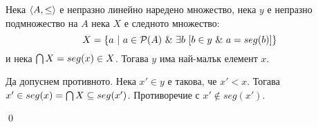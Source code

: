 \begin{tcolorbox}[mybox={Лема 3}, colback=purple!20, colframe=purple!40]

\quad
Нека $\langle A, \leq \rangle$ е непразно линейно наредено множество, нека $y$ е непразно подмножество на $A$
нека $X$ е следното множество:
\[
X = \{ a\ |\ a \in \mathcal{P}(A) \ \&\  \exists b\ [ b \in y \ \&\   a = seg(b)] \}
\]
\quad
и нека $\bigcap X = seg(x) \in X$. Тогава $y$ има най-малък елемент $x$.
\end{tcolorbox}

\begin{tcolorbox}[mybox={Доказателство:}]
\quad
Да допуснем противното.
Нека $x' \in y$ е такова, че $x' < x$.
Тогава $x' \in seg(x) = \bigcap X \subseteq seg(x')$.
Противоречие с $x' \notin seg(x')$.

\qed
\end{tcolorbox}
